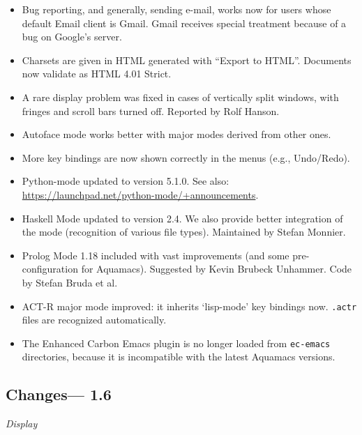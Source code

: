 \begin{itemize}
\item Bug reporting, and generally, sending e-mail, works now for users whose default Email client is Gmail.  Gmail receives special treatment because of a bug on Google's server. 

\item Charsets are given in HTML generated with ``Export to HTML''.  Documents now validate as HTML 4.01 Strict.

\item A rare display problem was fixed in cases of vertically split windows, with fringes and scroll bars turned off.
Reported by Rolf Hanson.

\item Autoface mode works better with major modes derived from other ones.

\item More key bindings are now shown correctly in the menus (e.g., Undo/Redo).

\item Python-mode updated to version 5.1.0.  See also: \url{https://launchpad.net/python-mode/+announcements}.

\item Haskell Mode updated to version 2.4.   We also provide better integration of the mode (recognition of various file types).
Maintained by Stefan Monnier.

\item Prolog Mode 1.18 included with vast improvements (and some pre-configuration for Aquamacs).  
Suggested by Kevin Brubeck Unhammer.  Code by Stefan Bruda et al.

\item ACT-R major mode improved: it inherits `lisp-mode' key bindings now.  {\tt .actr} files are recognized automatically.

\item The Enhanced Carbon Emacs plugin is no longer loaded from {\tt ec-emacs} directories, because it is incompatible with the latest Aquamacs versions.


\end{itemize}

\subsection{Changes--- 1.6}

\emph{Display}
 
